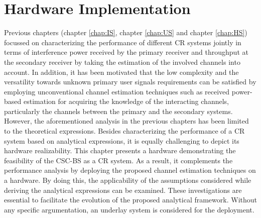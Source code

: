 \chapter{Hardware Implementation}
\label{chap:Field}

Previous chapters (chapter \ref{chap:IS}, chapter \ref{chap:US} and chapter \ref{chap:HS}) focussed on characterizing the performance of different CR systems jointly in terms of interference power received by the primary receiver and throughput at the secondary receiver by taking the estimation of the involved channels into account. In addition, it has been motivated that the low complexity and the versatility towards unknown primary user signals requirements can be satisfied by employing unconventional channel estimation techniques such as received power-based estimation for acquiring the knowledge of the interacting channels, particularly the channels between the primary and the secondary systems. However, the aforementioned analysis in the previous chapters has been limited to the theoretical expressions. Besides characterizing the performance of a CR system based on analytical expressions, it is equally challenging to depict its hardware realizability. This chapter presents a hardware demonstrating the feasibility of the CSC-BS as a CR system. As a result, it complements the performance analysis by deploying the proposed channel estimation techniques on a hardware. By doing this, the applicability of the assumptions considered while deriving the analytical expressions can be examined. These investigations are essential to facilitate the evolution of the proposed analytical framework. Without any specific argumentation, an underlay system is considered for the deployment.    

